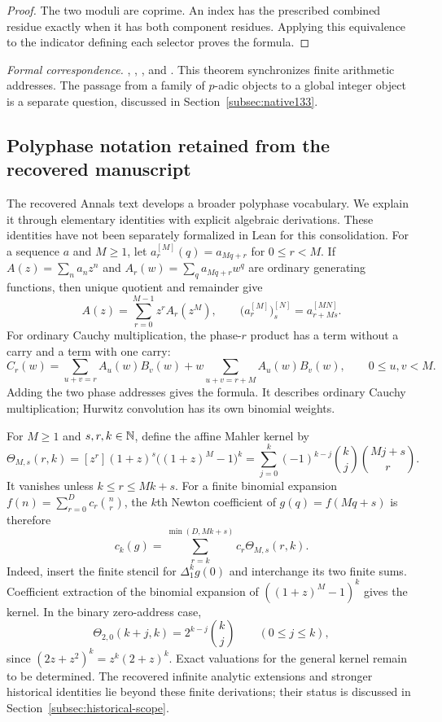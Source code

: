 \begin{proof}
The two moduli are coprime. An index has the prescribed combined residue
exactly when it has both component residues. Applying this equivalence to
the indicator defining each selector proves the formula.
\end{proof}

\begingroup\small\raggedright
\noindent\emph{Formal correspondence.}
, ,
, and
.
This theorem synchronizes finite arithmetic addresses. The passage from a
family of $p$-adic objects to a global integer object is a separate question,
discussed in Section~\ref{subsec:native133}.
\par\endgroup

\subsection{Polyphase notation retained from the recovered manuscript}
\label{subsec:polyphase-exposition}

The recovered Annals text develops a broader polyphase vocabulary. We explain
it through elementary identities with explicit algebraic derivations. These
identities have not been separately formalized in Lean for this consolidation.
For a sequence $a$ and $M\geq1$, let $a_r^{[M]}(q)=a_{Mq+r}$ for $0\leq r<M$.
If $A(z)=\sum_n a_nz^n$ and $A_r(w)=\sum_q a_{Mq+r}w^q$ are ordinary generating
functions, then unique quotient and remainder give
\[
A(z)=\sum_{r=0}^{M-1}z^rA_r(z^M),\qquad
\bigl(a_r^{[M]}\bigr)_s^{[N]}=a_{r+Ms}^{[MN]}.
\]
For ordinary Cauchy multiplication, the phase-$r$ product has a term without a
carry and a term with one carry:
\[
C_r(w)=\sum_{u+v=r}A_u(w)B_v(w)
+w\sum_{u+v=r+M}A_u(w)B_v(w),\qquad 0\leq u,v<M.
\]
Adding the two phase addresses gives the formula. It describes ordinary
Cauchy multiplication; Hurwitz convolution has its own binomial weights.

For $M\geq1$ and $s,r,k\in\mathbb N$, define the affine Mahler kernel by
\[
\Theta_{M,s}(r,k)=[z^r](1+z)^s\bigl((1+z)^M-1\bigr)^k
=\sum_{j=0}^{k}(-1)^{k-j}\binom kj\binom{Mj+s}{r}.
\]
It vanishes unless $k\leq r\leq Mk+s$. For a finite binomial expansion
$f(n)=\sum_{r=0}^{D}c_r\binom nr$, the $k$th Newton coefficient of
$g(q)=f(Mq+s)$ is therefore
\[
c_k(g)=\sum_{r=k}^{\min(D,Mk+s)}c_r\Theta_{M,s}(r,k).
\]
Indeed, insert the finite stencil for $\Delta_1^k g(0)$ and interchange its
two finite sums. Coefficient extraction of the binomial expansion of
$((1+z)^M-1)^k$ gives the kernel. In the binary zero-address case,
\[
\Theta_{2,0}(k+j,k)=2^{k-j}\binom kj\qquad(0\leq j\leq k),
\]
since $(2z+z^2)^k=z^k(2+z)^k$.
Exact valuations for the general kernel remain to be determined. The
recovered infinite analytic extensions and stronger historical identities
lie beyond these finite derivations; their status is discussed in
Section~\ref{subsec:historical-scope}.
